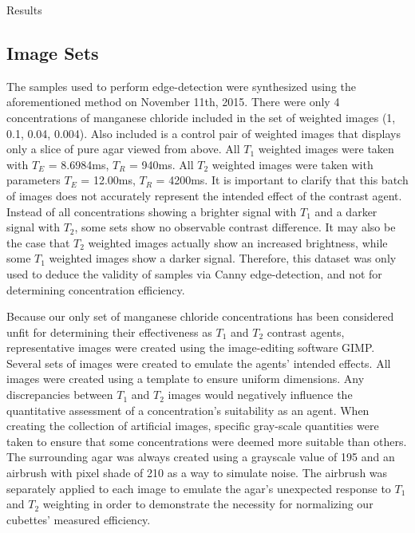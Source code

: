 \documentclass[a4paper,12pt]{article}
\begin{document}
\newpage
\begin{section}{Results}
\subsection{Image Sets}

The samples used to perform edge-detection were synthesized using the aforementioned method on November 11th, 2015. There were only 4 concentrations of manganese chloride included in the set of weighted images (1, 0.1, 0.04, 0.004). Also included is a control pair of weighted images that displays only a slice of pure agar viewed from above. All $T_1$ weighted images were taken with $T_E$ = 8.6984ms, $T_R$ = 940ms. All $T_2$ weighted images were taken with parameters $T_E$ = 12.00ms, $T_R$ = 4200ms. It is important to clarify that this batch of images does not accurately represent the intended effect of the contrast agent. Instead of all concentrations showing a brighter signal with $T_1$ and a darker signal with $T_2$, some sets show no observable contrast difference. It may also be the case that $T_2$ weighted images actually show an increased brightness, while some $T_1$ weighted images show a darker signal. Therefore, this dataset was only used to deduce the validity of samples via Canny edge-detection, and not for determining concentration efficiency. 

Because our only set of manganese chloride concentrations has been considered unfit for determining their effectiveness as $T_1$ and $T_2$ contrast agents, representative images were created using the image-editing software GIMP. Several sets of images were created to emulate the agents' intended effects. All images were created using a template to ensure uniform dimensions. Any discrepancies between $T_1$ and $T_2$ images would negatively influence the quantitative assessment of a concentration's suitability as an agent. When creating the collection of artificial images, specific gray-scale quantities were taken to ensure that some concentrations were deemed more suitable than others. The surrounding agar was always created using a grayscale value of 195 and an airbrush with pixel shade of 210 as a way to simulate noise. The airbrush was separately applied to each image to emulate the agar's unexpected response to $T_1$ and $T_2$ weighting in order to demonstrate the necessity for normalizing our cubettes' measured efficiency. 


\end{section}
\end{document}
